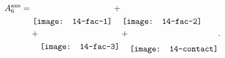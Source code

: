 \documentclass{standalone}
\begin{document}
$
 \begin{aligned}
	A_6^{\text{ans}}=&~\raisebox{-5.5mm}{\texttt{[image: 14-fac-1]}}+\raisebox{-5.5mm}{\texttt{[image: 14-fac-2]}}\\
	&+\raisebox{-5.5mm}{\texttt{[image: 14-fac-3]}}+\raisebox{-6.5mm}{\texttt{[image: 14-contact]}}.
\end{aligned}
$
\end{document}
